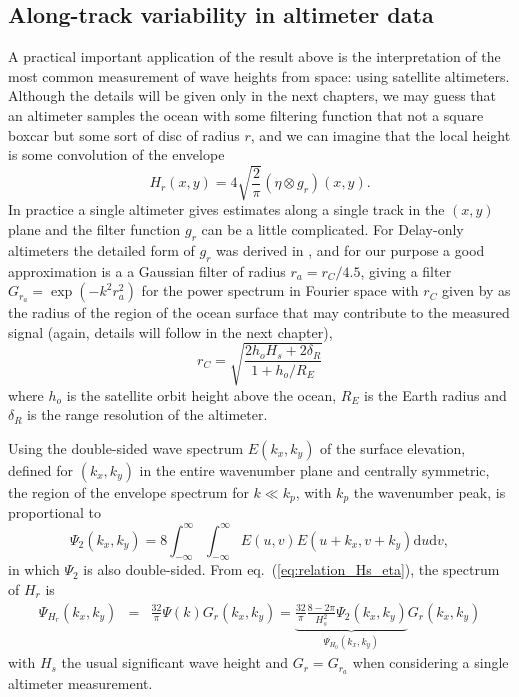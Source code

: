 {\subsection{Along-track variability in altimeter data}
A practical important application of the result above is the interpretation of the most common measurement of wave heights from space: using satellite altimeters. Although the details will be given only in the next chapters, we may guess that an altimeter samples the ocean with some filtering function that not a square boxcar but some sort of disc of radius $r$, and  we can imagine that the local height is some convolution of the envelope
\begin{equation}
    H_{r}(x,y) = 4\sqrt{\frac{2}{\pi}} (\eta \otimes g_{r})(x,y).
   \label{eq:relation_Hs_eta}
\end{equation}
In practice a single altimeter gives estimates along a single track in the $(x,y)$ plane and the filter function $g_r$ can be a little complicated. For Delay-only altimeters the detailed form of $g_r$ was derived in \cite{DeCarlo&al.2023}, and for our purpose a good approximation is a a Gaussian filter of radius $r_a=r_C/4.5$, giving a filter $G_{r_a}=\exp{(-k^2 r_a^2)}$ for the power spectrum in Fourier space with $r_C$ given by \cite{Chelton&al.1989} as the radius of the region of the ocean surface that may contribute to the measured signal (again, details will follow in the next chapter), 
\begin{equation}
    r_C =\sqrt{\frac{ 2 h_o H_s+ 2 \delta_R}{1+h_o/R_E}} \label{eq:rC}
\end{equation}
where $h_o$ is the satellite orbit height above the ocean, $R_E$ is the Earth radius and $\delta_R$ is the range resolution of the altimeter.  
 
 
Using the double-sided wave spectrum $E(k_x,k_y)$ of the surface elevation, defined for $(k_x,k_y)$ in the entire wavenumber plane and centrally symmetric, the region of the envelope spectrum for $k \ll k_p$, with $k_p$ the wavenumber peak, is 
proportional to
\begin{equation}
    \Psi_{2}(k_x,k_y) = 8 \int_{-\infty}^\infty 
    \int_{-\infty}^\infty
E(u,v)E(u+k_x,v+k_y)\mathrm{d}u \mathrm{d}v,
\end{equation}
in which $\Psi_{2}$ is also double-sided. From  eq.~(\ref{eq:relation_Hs_eta}), the spectrum of $H_r$ is
\begin{eqnarray}
\Psi_{H_r}(k_x,k_y) &= & \frac{32}{\pi}  \Psi(k)  G_{r}(k_x,k_y) =  \underbrace{\frac{32}{\pi} \frac{8 - 2\pi}{H_s^2}   \Psi_2(k_x,k_y)}_{\Psi_{H_0}(k_x,k_y)}  G_{r}(k_x,k_y)\label{eq:eq2_inFourier}
\end{eqnarray}
with $H_s$ the usual significant wave height and $G_{r}=G_{r_a}$ when considering a single altimeter measurement.

}

